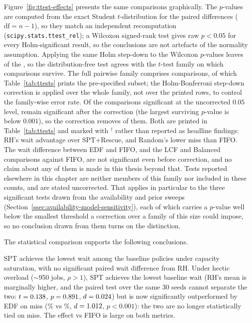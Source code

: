 {Figure~\ref{fig:ttest-effects} presents the same comparisons graphically. The $p$-values are computed from the exact Student $t$-distribution for the paired differences ($\mathrm{df}=n-1$), so they match an independent recomputation (\texttt{scipy.stats.ttest\_rel}); a Wilcoxon signed-rank test gives raw $p<0.05$ for every Holm-significant result, so the conclusions are not artefacts of the normality assumption. Applying the same Holm step-down to the Wilcoxon $p$-values leaves \WilcoxHolmNSig{} of the \HolmNSig{}, so the distribution-free test agrees with the $t$-test family on which comparisons survive. The full pairwise family comprises \HolmFamily{} comparisons, of which Table~\ref{tab:ttests} prints the pre-specified subset; the Holm-Bonferroni step-down correction is applied over the whole family, not over the printed rows, to control the family-wise error rate. Of the \HolmUncorrSig{} comparisons significant at the uncorrected $0.05$ level, \HolmNSig{} remain significant after the correction (the largest surviving $p$-value is below $0.001$), so the correction removes \HolmRemoved{} of them. Both are printed in Table~\ref{tab:ttests} and marked with $^\dagger$ rather than reported as headline findings: RH's wait advantage over SPT+Rescue, and Random's lower miss than FIFO. The wait difference between EDF and FIFO, and the LCF and Balanced comparisons against FIFO, are not significant even before correction, and no claim about any of them is made in this thesis beyond that. Tests reported elsewhere in this chapter are neither members of this family nor included in these counts, and are stated uncorrected. That applies in particular to the three significant tests drawn from the availability and prior sweeps (Section~\ref{ssec:availability-model-sensitivity}), each of which carries a $p$-value well below the smallest threshold a correction over a family of this size could impose, so no conclusion drawn from them turns on the distinction.

The statistical comparison supports the following conclusions.

SPT achieves the lowest wait among the baseline policies under capacity saturation, with no significant paired wait difference from RH. Under hectic overload ($\sim$950 jobs, $\rho>1$), SPT achieves the lowest baseline wait (RH's mean is marginally higher, and the paired test over the same 30 seeds cannot separate the two: $t=0.138$, $p=0.891$, $d=0.024$) but is now significantly outperformed by EDF on miss (\SPTmiss\% vs \EDFmiss\%, $d=1.012$, $p<0.001$): the two are no longer statistically tied on miss. The effect vs FIFO is large on both metrics.

}

